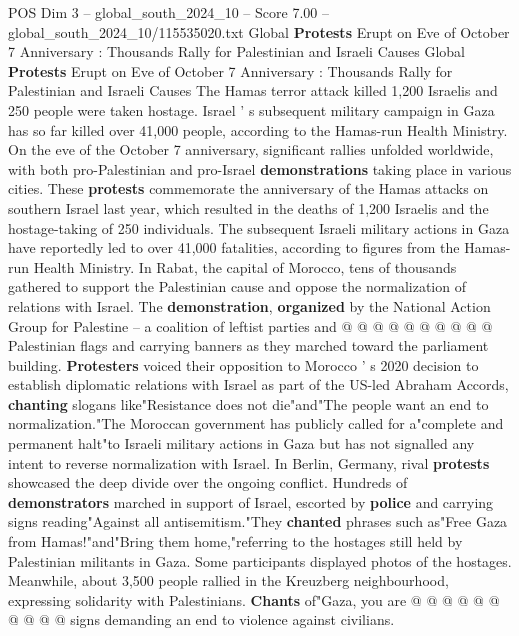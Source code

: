 \begin{textsample}{POS Dim 3 – global\_south\_2024\_10 – Score 7.00 – global\_south\_2024\_10/115535020.txt}  \label{ex:f3_pos_408}
Global \textbf{Protests} Erupt on Eve of October 7 Anniversary : Thousands Rally for Palestinian and Israeli Causes Global \textbf{Protests} Erupt on Eve of October 7 Anniversary : Thousands Rally for Palestinian and Israeli Causes The Hamas terror attack killed 1,200 Israelis and 250 people were taken hostage.
Israel ' s subsequent military campaign in Gaza has so far killed over 41,000 people, according to the Hamas-run Health Ministry.
On the eve of the October 7 anniversary, significant rallies unfolded worldwide, with both pro-Palestinian and pro-Israel \textbf{demonstrations} taking place in various cities.
These \textbf{protests} commemorate the anniversary of the Hamas attacks on southern Israel last year, which resulted in the deaths of 1,200 Israelis and the hostage-taking of 250 individuals.
The subsequent Israeli military actions in Gaza have reportedly led to over 41,000 fatalities, according to figures from the Hamas-run Health Ministry.
In Rabat, the capital of Morocco, tens of thousands gathered to support the Palestinian cause and oppose the normalization of relations with Israel.
The \textbf{demonstration}, \textbf{organized} by the National Action Group for Palestine -- a coalition of leftist parties and @ @ @ @ @ @ @ @ @ @ Palestinian flags and carrying banners as they marched toward the parliament building. \textbf{Protesters} voiced their opposition to Morocco ' s 2020 decision to establish diplomatic relations with Israel as part of the US-led Abraham Accords, \textbf{chanting} slogans like"Resistance does not die"and"The people want an end to normalization."The Moroccan government has publicly called for a"complete and permanent halt"to Israeli military actions in Gaza but has not signalled any intent to reverse normalization with Israel.
In Berlin, Germany, rival \textbf{protests} showcased the deep divide over the ongoing conflict.
Hundreds of \textbf{demonstrators} marched in support of Israel, escorted by \textbf{police} and carrying signs reading"Against all antisemitism."They \textbf{chanted} phrases such as"Free Gaza from Hamas!"and"Bring them home,"referring to the hostages still held by Palestinian militants in Gaza.
Some participants displayed photos of the hostages.
Meanwhile, about 3,500 people rallied in the Kreuzberg neighbourhood, expressing solidarity with Palestinians. \textbf{Chants} of"Gaza, you are @ @ @ @ @ @ @ @ @ @ signs demanding an end to violence against civilians.

\end{textsample}
